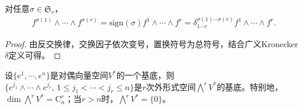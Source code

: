 \documentclass[../../main.tex]{subfiles}%
\begin{document}
\begin{proposition}
对任意$\sigma\in\mathfrak{S}_r$，
\begin{align}
f^{\sigma(1)}\wedge\cdots\wedge f^{\sigma(r)}=\mathrm{sign}(\sigma)f^1\wedge\cdots\wedge f^r=\delta_{1\cdots r}^{\sigma(1)\cdots\sigma(r)}f^1\wedge\cdots\wedge f^r.
\label{eq:wedge_perm}
\end{align}
\end{proposition}
\begin{proof}

由反交换律，交换因子依次变号，置换符号为总符号，结合广义Kronecker $\delta$定义可得。

\end{proof}

\begin{theorem}
设$\{e^1,\cdots,e^n\}$是对偶向量空间$V^*$的一个基底，则$\{e^{j_1}\land\cdots\land e^{j_r},\,1\leqslant j_1<\cdots<j_r\leqslant n\}$是$r$次外形式空间$\bigwedge^r V^*$的基底。特别地，$\dim\bigwedge^r V^* = \mathrm{C}_n^r$；当$r>n$时，$\bigwedge^r V^* = \{0\}$。
\end{theorem}
\end{document}
